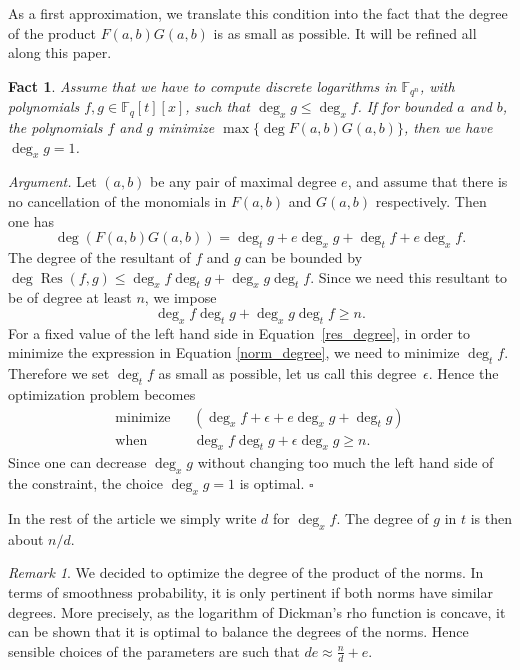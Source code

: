 \documentclass[a4wide]{article}
\newcommand{\F}{{\mathbb F}}
\DeclareMathOperator{\Res}{Res}
\theoremstyle{plain}
\newtheorem{fact}[theo]{Fact}
\theoremstyle{definition}
\theoremstyle{remark}
\newtheorem{rem}[theo]{Remark}
\begin{document}
As a first approximation, we translate this condition into the fact that
the degree of the product $F(a,b)G(a,b)$ is as small as possible. It will
be refined all along this paper.

\begin{fact}\label{linear_g}
        Assume that we have to compute discrete logarithms in $\F_{q^n}$,
        with polynomials $f,g\in\F_q[t][x]$, such that 
	$\deg_xg\leq \deg_x f$.
        If for bounded $a$ and $b$, the polynomials $f$ and $g$ minimize 
        $\max\{\deg F(a,b)G(a,b)\}$, then we have $\deg_xg=1$.
\end{fact}
\noindent\textit{Argument.}
Let $(a,b)$ be any pair of maximal degree $e$, and assume that
there is no cancellation of the monomials in $F(a,b)$ and $G(a,b)$
respectively. Then one has
\begin{equation}
\label{norm_degree}
\deg\left(F(a,b) G(a,b)\right)=\deg_t g+e\deg_x g+\deg_t f+e\deg_xf.
\end{equation}
The degree of the resultant of $f$ and $g$ can be bounded by
$ \deg \Res(f,g) \leq \deg_xf\deg_t g+\deg_xg\deg_t f$.
Since we need this resultant to be of degree at least $n$, we impose
\begin{equation}
\label{res_degree}
\deg_xf\deg_t g+\deg_xg\deg_t f\geq n.
\end{equation}
 For a fixed value of the left hand side in
Equation~\ref{res_degree}, in order to minimize the expression in Equation
\ref{norm_degree}, we need to minimize $\deg_tf$. Therefore we set
$\deg_tf$ as small as possible, let us call this degree~$\epsilon$.
Hence the optimization problem becomes
\begin{eqnarray*}
\text{minimize} & &\left( \deg_xf+ \epsilon + e\deg_xg+\deg_t g\right)\\
	     \text{when}& &\deg_xf \deg_t g+\epsilon \deg_xg\geq n.
\end{eqnarray*}
Since one can decrease $\deg_x g$ without changing too much the left
hand side of
the constraint, the choice $\deg_x g=1$ is optimal. $\square$ 
\medskip


In the rest of the article we simply write $d$ for $\deg_xf$. The degree
of $g$ in $t$ is then about $n/d$.


\begin{rem}
    We decided to optimize the degree of the product of the norms. In
    terms of smoothness probability, it is only pertinent if both norms
    have similar degrees. More precisely, as  the
    logarithm of Dickman's
    rho function is concave, it can be shown that it is optimal to balance the
    degrees of the norms. Hence sensible choices of the parameters are
    such that
$de\approx \frac{n}{d}+e$.
\end{rem}
\end{document}
